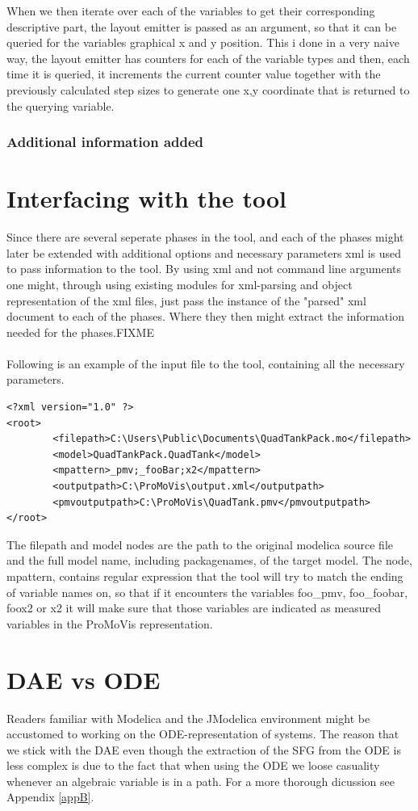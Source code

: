 When we then iterate over each of the variables to get their corresponding descriptive part, the layout emitter is passed as an argument, so that it can be queried for the variables graphical x and y position. This i done in a very naive way, the layout emitter has counters for each of the variable types and then, each time it is queried, it increments the current counter value together with the previously calculated step sizes to generate one x,y coordinate that is returned to the querying variable. 
\subsubsection{Additional information added}

\section{Interfacing with the tool}
Since there are several seperate phases in the tool, and each of the phases might later be extended with additional options and necessary parameters xml is used to pass information to the tool. By using xml and not command line arguments one might, through using existing modules for xml-parsing and object representation of the xml files, just pass the instance of the "parsed" xml document to each of the phases. Where they then might extract the information needed for the phases.FIXME\\\\Following is an example of the input file to the tool, containing all the necessary parameters.
\lstset{language=XML}
\begin{lstlisting}
<?xml version="1.0" ?> 
<root>
        <filepath>C:\Users\Public\Documents\QuadTankPack.mo</filepath>
        <model>QuadTankPack.QuadTank</model>
        <mpattern>_pmv;_fooBar;x2</mpattern>
        <outputpath>C:\ProMoVis\output.xml</outputpath>
        <pmvoutputpath>C:\ProMoVis\QuadTank.pmv</pmvoutputpath>
</root>
\end{lstlisting}
The filepath and model nodes are the path to the original modelica source file and the full model name, including packagenames, of the target model. The node, mpattern, contains regular expression that the tool will try to match the ending of variable names on, so that if it encounters the variables foo\_pmv, foo\_foobar, foox2 or x2 it will make sure that those variables are indicated as measured variables in the ProMoVis representation.


\section{DAE vs ODE}
Readers familiar with Modelica and the JModelica environment might be accustomed to working on the ODE-representation of systems. The reason that we stick with the DAE even though the extraction of the SFG from the ODE is less complex is due to the fact that when using the ODE we loose casuality whenever an algebraic variable is in a path. For a more thorough dicussion see Appendix \ref{appB}.


